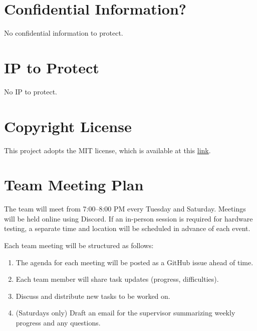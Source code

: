 \documentclass{article}
\begin{document}
\section{Confidential Information?}


No confidential information to protect.

\section{IP to Protect}


No IP to protect.

\section{Copyright License}


This project adopts the MIT license, which is available at this
\href{https://github.com/ZifanSi/vision-guided-tracker/blob/main/LICENSE}{link}.

\section{Team Meeting Plan}

The team will meet from 7:00–8:00 PM every Tuesday and Saturday. Meetings will
be held online using Discord. If an in-person session is required for hardware
testing, a separate time and location will be scheduled in advance of each
event.

Each team meeting will be structured as follows:

\begin{enumerate}
  \item The agenda for each meeting will be posted as a GitHub issue ahead of time.
  \item Each team member will share task updates (progress, difficulties).
  \item Discuss and distribute new tasks to be worked on.
  \item (Saturdays only) Draft an email for the supervisor summarizing weekly progress and any questions.
\end{enumerate}
\end{document}
